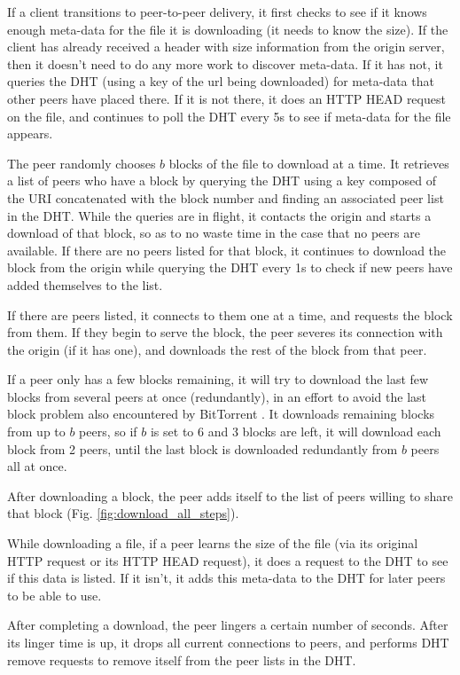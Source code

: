 If a client transitions to peer-to-peer delivery, it first checks to see if it knows enough meta-data for the file it is downloading (it needs to know the size).
If the client has already received a header with size information from the origin server, then it doesn't need to do any more work to discover meta-data.  If it has not, it
queries the DHT (using a key of the url being downloaded) for meta-data that other peers have placed there.  If it is not there, it does an HTTP HEAD request on the file, and continues
to poll the DHT every 5s to see if meta-data for the file appears.  

The peer randomly chooses $b$ blocks of the file to download at a time.  It retrieves a list of peers who have a block by querying the DHT using a key composed of
the URI concatenated with the block number and finding an associated peer list in the DHT.  While the queries are in flight, it contacts the origin and starts a download of that block, so as to no waste time in the case that no peers are available.
If there are no peers listed for that block, it continues to download the block from the origin while querying the DHT every 1s to check if new peers have added themselves to the list.

If there are peers listed, it connects to them one at a time, and requests the block from them.  If they begin to serve the block, the peer severes its connection with the origin (if it has one),
and downloads the rest of the block from that peer.

If a peer only has a few blocks remaining, it will try to download the last few blocks from several peers at once (redundantly), in an effort to avoid the last block problem also
encountered by BitTorrent \cite{bram}.  It downloads remaining blocks from up to $b$ peers, so if $b$ is set to 6 and 3 blocks are left, it will download each block from 2 peers, until
the last block is downloaded redundantly from $b$ peers all at once.

After downloading a block, the peer adds itself to the list of peers willing to share that block (Fig. \ref{fig:download_all_steps}).  

While downloading a file, if a peer learns the size of the file (via its original HTTP request or its HTTP HEAD request), it does a request to the DHT to see if this
data is listed.  If it isn't, it adds this meta-data to the DHT for later peers to be able to use.

After completing a download, the peer lingers a certain number of seconds.  After its linger time is up, it drops all current connections to peers, and performs DHT remove requests to
remove itself from the peer lists in the DHT.

